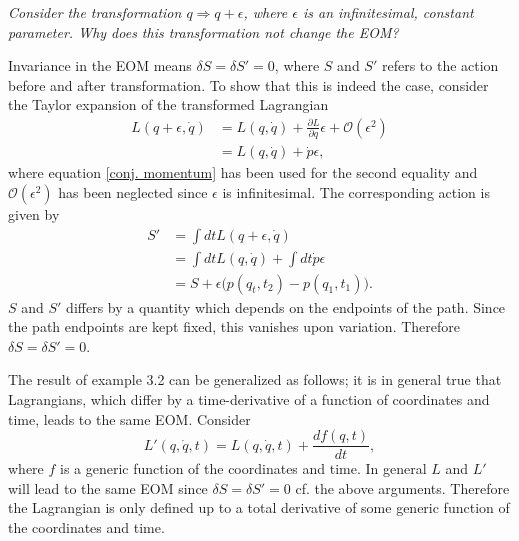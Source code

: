 \begin{example}
	\emph{Consider the transformation $q\Rightarrow q+\epsilon$, where $\epsilon$ is an infinitesimal, constant parameter. Why does this transformation not change the EOM?}\newline
	
	Invariance in the EOM means $\delta S=\delta S'=0$, where $S$ and $S'$ refers to the action before and after transformation. To show that this is indeed the case, consider the Taylor expansion of the transformed Lagrangian
	\begin{equation}
		\begin{split}
			L(q+\epsilon,\dot{q})&=L(q,\dot{q})+\frac{\partial L}{\partial q}\epsilon+\mathcal{O}(\epsilon^2)\\
			&=L(q,\dot{q})+\dot{p}\epsilon,
		\end{split}
	\end{equation} 
	where equation \eqref{conj. momentum} has been used for the second equality and $\mathcal{O}(\epsilon^2)$ has been neglected since $\epsilon$ is infinitesimal. The corresponding action is given by
	\begin{equation}
		\begin{split}
			S'&=\int dt L(q+\epsilon,\dot{q})\\
			&=\int dt L(q,\dot{q})+\int dt\dot{p}\epsilon\\
			&=S+\epsilon \bigg(p(q_t,t_2)-p(q_1,t_1)\bigg).
		\end{split}
	\end{equation} 
	$S$ and $S'$ differs by a quantity which depends on the endpoints of the path. Since the path endpoints are kept fixed, this vanishes upon variation. Therefore $\delta S=\delta S'=0$. 
\end{example}
The result of example 3.2 can be generalized as follows; it is in general true that Lagrangians, which differ by a time-derivative of a function of coordinates and time, leads to the same EOM. Consider
\begin{equation}
	L'(q,\dot{q},t)=L(q,\dot{q},t)+\frac{df(q,t)}{dt},
\end{equation} 
where $f$ is a generic function of the coordinates and time. In general $L$ and $L'$ will lead to the same EOM since $\delta S=\delta S'=0$ cf. the above arguments. Therefore the Lagrangian is only defined up to a total derivative of some generic function of the coordinates and time. 

